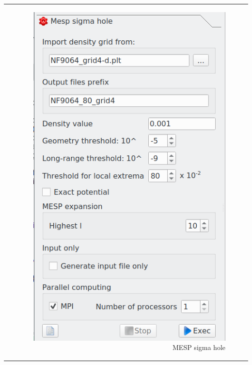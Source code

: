\documentclass[10pt]{article}
\begin{document}
\begin{tabular}{lr}
\begin{minipage}{.6\linewidth}
\end{minipage}
&
\begin{minipage}{.4\linewidth}
\begin{figure}[H]
\begin{center}
\vspace*{-0.5mm}
\includegraphics[width=.8\linewidth]{damqt320_mesp_sg_hole.png}
\end{center}
\caption{{MESP sigma hole}\label{fig:2_7}}
\end{figure}
\end{minipage}
\end{tabular}

\vspace*{0.3mm}
\end{document}
